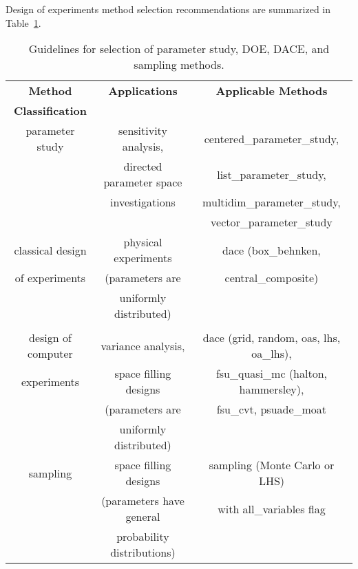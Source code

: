 Design of experiments method selection recommendations are summarized
in Table~\ref{dace:usage:table}.

\begin{table}
\centering
\caption{Guidelines for selection of parameter study, DOE, DACE, and
sampling methods.}
\label{dace:usage:table}\vspace{2mm}
\begin{tabular}{|c|c|c|}
\hline
\textbf{Method} & \textbf{Applications} & \textbf{Applicable Methods} \\
\textbf{Classification} & & \\
\hline
parameter study & sensitivity analysis,    & centered\_parameter\_study, \\
                & directed parameter space & list\_parameter\_study, \\
                & investigations           & multidim\_parameter\_study, \\
                &                          & vector\_parameter\_study \\
\hline
classical design & physical experiments    & dace (box\_behnken, \\
of experiments   & (parameters are         & central\_composite) \\
                 & uniformly distributed)  & \\
                 &                         & \\
\hline
design of computer & variance analysis,     & dace (grid, random,
                                              oas, lhs, oa\_lhs), \\
experiments        & space filling designs  & fsu\_quasi\_mc (halton, 
                                              hammersley), \\
                   & (parameters are        & fsu\_cvt, psuade\_moat \\
                   & uniformly distributed) & \\
\hline
sampling           & space filling designs      & sampling
                                                  (Monte Carlo or LHS) \\
                   & (parameters have general   & with all\_variables flag \\
                   & probability distributions) & \\
\hline
\end{tabular}
\end{table}
